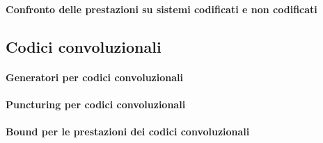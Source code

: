             \paragraph{Confronto delle prestazioni su sistemi codificati e non codificati}
        \subsection{Codici convoluzionali}
            \paragraph{Generatori per codici convoluzionali}
            \paragraph{Puncturing per codici convoluzionali}
            \paragraph{Bound per le prestazioni dei codici convoluzionali}